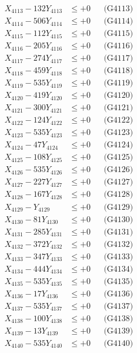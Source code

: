\documentclass[a4paper,10pt]{article}
\begin{document}
{\begin{align}
X_{4113} - 132Y_{4113} &\leq +0 && \text{(G4113)} \\
X_{4114} - 506Y_{4114} &\leq +0 && \text{(G4114)} \\
X_{4115} - 112Y_{4115} &\leq +0 && \text{(G4115)} \\
X_{4116} - 205Y_{4116} &\leq +0 && \text{(G4116)} \\
X_{4117} - 274Y_{4117} &\leq +0 && \text{(G4117)} \\
X_{4118} - 459Y_{4118} &\leq +0 && \text{(G4118)} \\
X_{4119} - 535Y_{4119} &\leq +0 && \text{(G4119)} \\
X_{4120} - 419Y_{4120} &\leq +0 && \text{(G4120)} \\
\allowbreak
X_{4121} - 300Y_{4121} &\leq +0 && \text{(G4121)} \\
X_{4122} - 124Y_{4122} &\leq +0 && \text{(G4122)} \\
X_{4123} - 535Y_{4123} &\leq +0 && \text{(G4123)} \\
X_{4124} - 47Y_{4124} &\leq +0 && \text{(G4124)} \\
X_{4125} - 108Y_{4125} &\leq +0 && \text{(G4125)} \\
X_{4126} - 535Y_{4126} &\leq +0 && \text{(G4126)} \\
X_{4127} - 227Y_{4127} &\leq +0 && \text{(G4127)} \\
X_{4128} - 167Y_{4128} &\leq +0 && \text{(G4128)} \\
X_{4129} - Y_{4129} &\leq +0 && \text{(G4129)} \\
X_{4130} - 81Y_{4130} &\leq +0 && \text{(G4130)} \\
\allowbreak
X_{4131} - 285Y_{4131} &\leq +0 && \text{(G4131)} \\
X_{4132} - 372Y_{4132} &\leq +0 && \text{(G4132)} \\
X_{4133} - 347Y_{4133} &\leq +0 && \text{(G4133)} \\
X_{4134} - 444Y_{4134} &\leq +0 && \text{(G4134)} \\
X_{4135} - 535Y_{4135} &\leq +0 && \text{(G4135)} \\
X_{4136} - 17Y_{4136} &\leq +0 && \text{(G4136)} \\
X_{4137} - 535Y_{4137} &\leq +0 && \text{(G4137)} \\
X_{4138} - 100Y_{4138} &\leq +0 && \text{(G4138)} \\
X_{4139} - 13Y_{4139} &\leq +0 && \text{(G4139)} \\
X_{4140} - 535Y_{4140} &\leq +0 && \text{(G4140)} \\

\end{align}}
\end{document}
